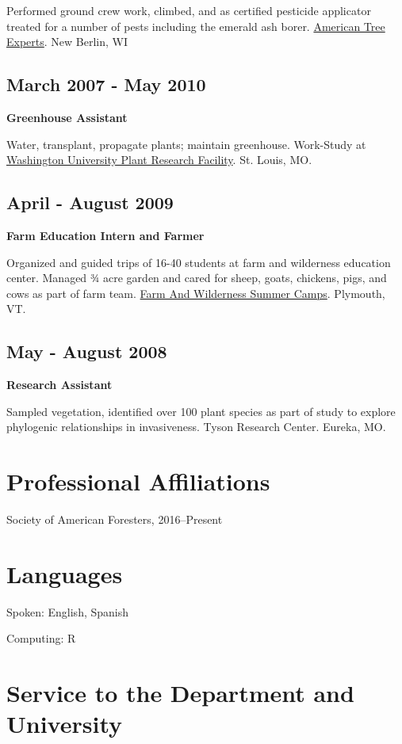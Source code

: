\documentclass{article}
\begin{document}
Performed ground crew work, climbed, and as certified pesticide
applicator treated for a number of pests including the emerald ash
borer. \href{http://atetreecare.com/}{American Tree Experts}.  New Berlin, WI

\subsection*{March 2007 - May 2010}
\label{sec:org9af17f5}
\textbf{Greenhouse Assistant}

Water, transplant, propagate plants; maintain greenhouse. Work-Study
at \href{http://biology4.wustl.edu/greenhouse/index.html}{Washington University Plant Research Facility}. St. Louis, MO.

\subsection*{April - August 2009}
\label{sec:orga390522}
\textbf{Farm Education Intern and Farmer}

Organized and guided trips of 16-40 students at farm and wilderness
education center. Managed 3⁄4 acre garden and cared for sheep, goats,
chickens, pigs, and cows as part of farm team.  \href{https://farmandwilderness.org/}{Farm And Wilderness
Summer Camps}. Plymouth, VT.

\subsection*{May - August 2008}
\label{sec:org736173e}
\textbf{Research Assistant}

Sampled vegetation, identified over 100 plant species as part of study
to explore phylogenic relationships in invasiveness.  Tyson Research
Center. Eureka, MO.
\section*{Professional Affiliations}
\label{sec:org94c841c}
Society of American Foresters, 2016--Present

\section*{Languages}
\label{sec:orgc80c1e7}
Spoken: English, Spanish

Computing: R

\section*{Service to the Department and University}
\label{sec:org89a6e73}
\end{document}
